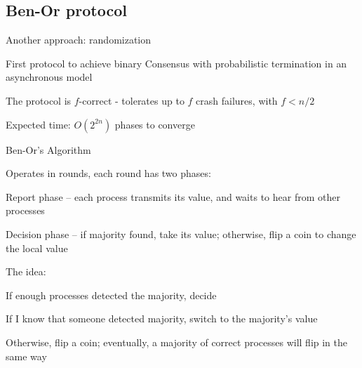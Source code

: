 \subsection{Ben-Or protocol}

\begin{frame}{Another approach: randomization}

\BI
\item First protocol to achieve \alert{binary} Consensus with probabilistic termination in an asynchronous model 
\item The protocol is $f$-correct - tolerates up to $f$ crash failures, with $f < n/2$ 
\item Expected time: $O(2^{2n})$ phases to converge
\EI

\bigskip
\begin{Bib}
\BI
\item {}
\EI
\end{Bib}

\end{frame}

\begin{frame}{Ben-Or's Algorithm}

\BIL	
\item Operates in rounds, each round has two phases:
\BI
\item \alert{Report phase} – each process transmits its value, and waits to hear from other processes
\item \alert{Decision phase} – if majority found, take its value; otherwise, flip a coin to change the local value
\EI

\item The idea:
\BI
\item If enough processes detected the majority, decide
\item If I know that someone detected majority, switch to the majority’s value
\item Otherwise, flip a coin; eventually, a majority of correct processes will flip in the same way
\EI

\EIL
\end{frame}


